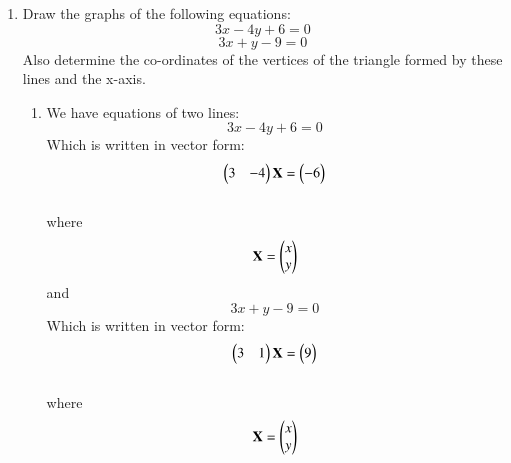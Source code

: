 \documentclass[journal,12pt,twocolumn]{IEEEtran}
\renewcommand\thesection{\arabic{section}}
\begin{document}
\begin{enumerate}[label=\thesection.\arabic*.,ref=\thesection.\theenumi]
\item Draw the graphs of the following equations: 
\[ 3x-4y+6=0 \]
\[ 3x+y-9=0 \]
Also determine the co-ordinates of the vertices of the triangle formed by these lines and the x-axis.\\
\solution\begin{enumerate}
    \item We have equations of two lines:
\begin{equation}\label{eq:1}
    3x-4y+6=0
    \end{equation}
    Which is written in vector form:
    \begin{align}
        \begin{pmatrix}3&-4\end{pmatrix}\mathbf{X}=\begin{pmatrix}-6\end{pmatrix}
    \end{align}\\where \begin{align}
        \mathbf{X}=\begin{pmatrix}x\\y\end{pmatrix}
    \end{align}
    and 
    \begin{equation}\label{eq:2}
        3x+y-9=0 
    \end{equation}
    Which is written in vector form:
    \begin{align}
        \begin{pmatrix}3&1\end{pmatrix}\mathbf{X}=\begin{pmatrix}9\end{pmatrix}
    \end{align}
\\where \begin{align}
        \mathbf{X}=\begin{pmatrix}x\\y\end{pmatrix}
    \end{align}


\end{enumerate}
\end{enumerate}
\end{document}
